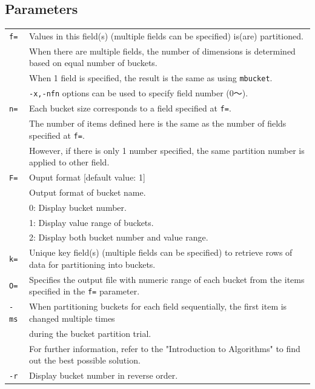 \subsection*{Parameters}
\begin{table}[hbt]
{\small
\begin{tabular}{ll}
\verb|f=|    & Values in this field(s) (multiple fields can be specified) is(are) partitioned.  \\
             & When there are multiple fields, the number of dimensions is determined based on equal number of buckets. \\
             & When 1 field is specified, the result is the same as using \verb|mbucket|. \\
             & \verb|-x,-nfn| options can be used to specify field number (0〜).\\
\verb|n=|    & Each bucket size corresponds to a field specified at \verb|f=|. \\
		& The number of items defined here is the same as the number of fields specified at \verb|f=|. \\
		& However, if there is only 1 number specified, the same partition number is applied to other field.  \\
\verb|F=|    & Ouput format [default value: 1]\\
             & Output format of bucket name.\\
             & 0: Display bucket number. \\
             & 1: Display value range of buckets. \\
             & 2: Display both bucket number and value range. \\
\verb|k=|    & Unique key field(s) (multiple fields can be specified) to retrieve rows of data for partitioning into buckets. \\
\verb|O=|    & Specifies the output file with numeric range of each bucket from the items specified in the \verb|f=| parameter.  \\
\verb|-ms|   & When partitioning buckets for each field sequentially, the first item is changed multiple times \\
		& during the bucket partition trial. \\
             & For further information, refer to the "Introduction to Algorithms" to find out the best possible solution. \\
\verb|-r|    & Display bucket number in reverse order. \\
\end{tabular} 
}
\end{table} 

